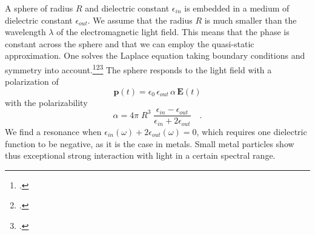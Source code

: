 A sphere of radius $R$ and dielectric constant $\epsilon_{in}$ is embedded in a medium of dielectric constant $\epsilon_{out}$. We assume that the radius $R$ is much smaller than the wavelength $\lambda$ of the electromagnetic light field. This means that the phase is constant across the sphere and that we can employ the quasi-static approximation. One solves the Laplace equation taking  boundary conditions and symmetry into account.\footcite{Jackson-ED}\footcite[excercise 2.4.2]{Nolting-ED}\footcite[chapter 5.2]{BH-book}
The sphere responds to the light field with a polarization of
\begin{equation}
 \mathbf{p}(t) = \epsilon_0 \,  \epsilon_{out} \, \alpha \, \mathbf{E}(t)
\end{equation}
with the polarizability
\begin{equation}
 \alpha = 4 \pi  \; R^3 \; \frac{\epsilon_{in} - \epsilon_{out}}{\epsilon_{in} + 2 \epsilon_{out}} \quad .
\end{equation}
We find a resonance when $\epsilon_{in}(\omega) + 2 \epsilon_{out}(\omega) = 0$, which requires one dielectric function to be negative, as it is the case in metals. Small metal particles show thus exceptional strong interaction with light in a certain spectral range.





